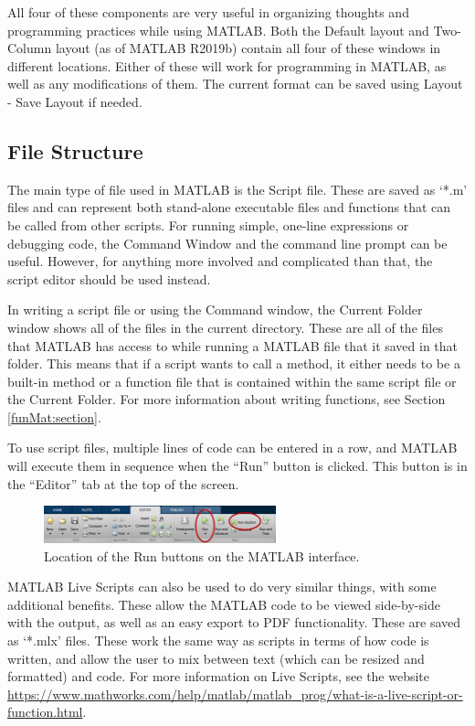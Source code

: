 \documentclass{ximera}
\begin{document}
All four of these components are very useful in organizing thoughts and programming practices while using MATLAB. Both the Default layout and Two-Column layout (as of MATLAB R2019b) contain all four of these windows in different locations. Either of these will work for programming in MATLAB, as well as any modifications of them. The current format can be saved using Layout - Save Layout if needed.

\subsection{File Structure}

The main type of file used in MATLAB is the Script file. These are saved as `*.m' files and can represent both stand-alone executable files and functions that can be called from other scripts. For running simple, one-line expressions or debugging code, the Command Window and the command line prompt can be useful. However, for anything more involved and complicated than that, the script editor should be used instead.

In writing a script file or using the Command window, the Current Folder window shows all of the files in the current directory. These are all of the files that MATLAB has access to while running a MATLAB file that it saved in that folder. This means that if a script wants to call a method, it either needs to be a built-in method or a function file that is contained within the same script file or the Current Folder. For more information about writing functions, see Section \ref{funMat:section}. 

To use script files, multiple lines of code can be entered in a row, and MATLAB will execute them in sequence when the ``Run'' button is clicked. This button is in the ``Editor'' tab at the top of the screen.
\begin{figure}[h]
    \centering
    \includegraphics[width=0.6\textwidth]{figures/MatlabDemo_runButtons.png}
    \caption{Location of the Run buttons on the MATLAB interface.}
    \label{fig:MatlabDemo_Run}
\end{figure}

MATLAB Live Scripts can also be used to do very similar things, with some additional benefits. These allow the MATLAB code to be viewed side-by-side with the output, as well as an easy export to PDF functionality. These are saved as `*.mlx' files. These work the same way as scripts in terms of how code is written, and allow the user to mix between text (which can be resized and formatted) and code. For more information on Live Scripts, see the website \url{https://www.mathworks.com/help/matlab/matlab_prog/what-is-a-live-script-or-function.html}. 
\end{document}
